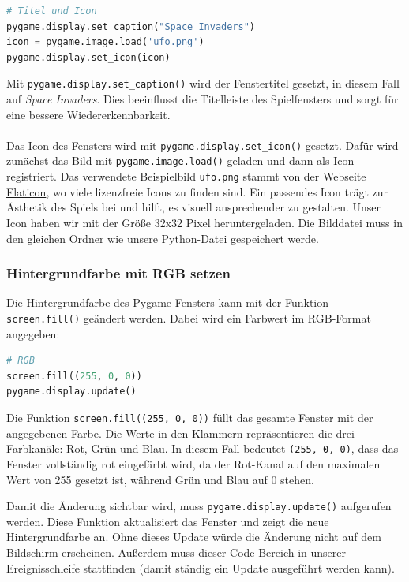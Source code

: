 \documentclass{article}
\begin{document}
\begin{lstlisting}[style=pythonstyle, language=Python]
# Titel und Icon
pygame.display.set_caption("Space Invaders")
icon = pygame.image.load('ufo.png')
pygame.display.set_icon(icon)
\end{lstlisting}

Mit \texttt{pygame.display.set\_caption()} wird der Fenstertitel gesetzt, in diesem Fall auf \textit{Space Invaders}. Dies beeinflusst die Titelleiste des Spielfensters und sorgt für eine bessere Wiedererkennbarkeit.
\\
\\
Das Icon des Fensters wird mit \texttt{pygame.display.set\_icon()} gesetzt. Dafür wird zunächst das Bild mit \texttt{pygame.image.load()} geladen und dann als Icon registriert. Das verwendete Beispielbild \texttt{ufo.png} stammt von der Webseite \href{https://www.flaticon.com/}{Flaticon}, wo viele lizenzfreie Icons zu finden sind. Ein passendes Icon trägt zur Ästhetik des Spiels bei und hilft, es visuell ansprechender zu gestalten. Unser Icon haben wir mit der Größe 32x32 Pixel heruntergeladen. Die Bilddatei muss in den gleichen Ordner wie unsere Python-Datei gespeichert werde.


\subsubsection{Hintergrundfarbe mit RGB setzen}
Die Hintergrundfarbe des Pygame-Fensters kann mit der Funktion \texttt{screen.fill()} geändert werden. Dabei wird ein Farbwert im RGB-Format angegeben:

\begin{lstlisting}[style=pythonstyle, language=Python]
# RGB
screen.fill((255, 0, 0))
pygame.display.update()
\end{lstlisting}

Die Funktion \texttt{screen.fill((255, 0, 0))} füllt das gesamte Fenster mit der angegebenen Farbe. Die Werte in den Klammern repräsentieren die drei Farbkanäle: Rot, Grün und Blau. In diesem Fall bedeutet \texttt{(255, 0, 0)}, dass das Fenster vollständig rot eingefärbt wird, da der Rot-Kanal auf den maximalen Wert von 255 gesetzt ist, während Grün und Blau auf 0 stehen.

Damit die Änderung sichtbar wird, muss \texttt{pygame.display.update()} aufgerufen werden. Diese Funktion aktualisiert das Fenster und zeigt die neue Hintergrundfarbe an. Ohne dieses Update würde die Änderung nicht auf dem Bildschirm erscheinen. Außerdem muss dieser Code-Bereich in unserer Ereignisschleife stattfinden (damit ständig ein Update ausgeführt werden kann).
\end{document}
